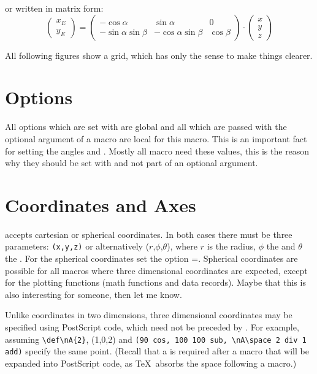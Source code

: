 \documentclass[11pt,english,bibliography=totoc,parskip=false,headings=small,
    headinclude=false,footinclude=false,twoside,english,usegeometry]{pst-doc}
\begin{document}
\noindent or written in matrix form:
{\footnotesize\addtolength{\arraycolsep}{-2pt}
\begin{equation}
\begin{pmatrix}x_E\\y_E\end{pmatrix}=
  \begin{pmatrix}
    -\cos\alpha & \sin\alpha & 0\\
    -\sin\alpha\sin\beta & -\cos\alpha\sin\beta & \cos\beta
  \end{pmatrix}\cdot
\begin{pmatrix}x\\y\\z\end{pmatrix}
\end{equation}%
\addtolength{\arraycolsep}{2pt}%
}

All following figures show a grid, which has only the sense to make things clearer.

\section{Options}
All options which are set with  are global and all which are passed with the optional 
argument of a macro are local for this macro. This is an important fact for setting the angles 
 and . Mostly all macro need these values, this is the reason why they 
should be set with  and not part of an optional argument.


\section{Coordinates and Axes}
 accepts cartesian or spherical coordinates. In both cases there
must be three parameters: \verb+(x,y,z)+ or alternatively ($r$,$\phi$,$\theta$),
where $r$ is the radius, $\phi$ the  and $\theta$ the .
For the spherical coordinates set the option =\true. Spherical coordinates
are possible for all macros where three dimensional coordinates are expected, except
for the plotting functions (math functions and data records). Maybe that this is also interesting
for someone, then let me know.

Unlike coordinates in two dimensions, three dimensional coordinates  
may be specified using PostScript code, which need not be preceded by  
\Lnotation{!}. For example, assuming \verb+\def\nA{2}+, (1,0,2) and 
\verb+(90 cos, 100 100 sub, \nA\space 2 div 1 add)+ specify the same point.  
(Recall that a  is required after a macro that will be  
expanded into PostScript code, as \TeX\ absorbs the space following a  
macro.)
\end{document}
